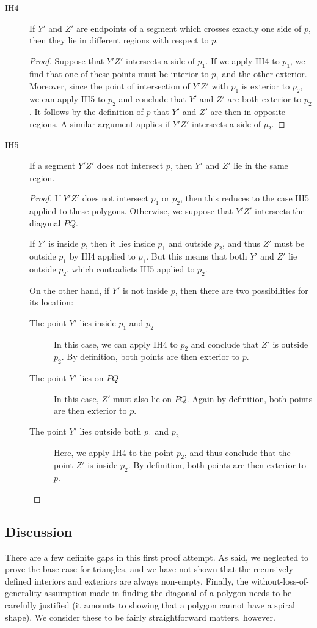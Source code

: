 \begin{description}
\item[IH4] If $Y'$ and $Z'$ are endpoints of a segment which crosses exactly one side of $p$, then they lie in different regions with respect to $p$.
  \begin{proof}
     Suppose that $Y'Z'$ intersects a side of $p_1$. If we apply IH4 to $p_1$, we find that one of these points must be interior to $p_1$ and the other exterior. Moreover, since the point of intersection of $Y'Z'$ with $p_1$ is exterior to $p_2$, we can apply IH5 to $p_2$ and conclude that $Y'$ and $Z'$ are both exterior to $p_2$. It follows by the definition of $p$ that $Y'$ and $Z'$ are then in opposite regions. A similar argument applies if $Y'Z'$ intersects a side of $p_2$.
  \end{proof}
\item[IH5] If a segment $Y'Z'$ does not intersect $p$, then $Y'$ and $Z'$ lie in the same region.
  \begin{proof}
    If $Y'Z'$ does not intersect $p_1$ or $p_2$, then this reduces to the case IH5 applied to these polygons. Otherwise, we suppose that $Y'Z'$ intersects the diagonal $PQ$. 

    If $Y'$ is inside $p$, then it lies inside $p_1$ and outside $p_2$, and thus $Z'$ must be outside $p_1$ by IH4 applied to $p_1$. But this means that both $Y'$ and $Z'$ lie outside $p_2$, which contradicts IH5 applied to $p_2$. 

    On the other hand, if $Y'$ is not inside $p$, then there are two possibilities for its location:
    \begin{description}
    \item[The point $Y'$ lies inside $p_1$ and $p_2$] In this case, we can apply IH4 to $p_2$ and conclude that $Z'$ is outside $p_2$. By definition, both points are then exterior to $p$. 
    \item[The point $Y'$ lies on $PQ$] In this case, $Z'$ must also lie on $PQ$. Again by definition, both points are then exterior to $p$.
    \item[The point $Y'$ lies outside both $p_1$ and $p_2$] Here, we apply IH4 to the point $p_2$, and thus conclude that the point $Z'$ is inside $p_2$. By definition, both points are then exterior to $p$.
    \end{description}
  \end{proof}
\end{description}

\subsection{Discussion}
There are a few definite gaps in this first proof attempt. As said, we neglected to prove the base case for triangles, and we have not shown that the recursively defined interiors and exteriors are always non-empty. Finally, the without-loss-of-generality assumption made in finding the diagonal of a polygon needs to be carefully justified (it amounts to showing that a polygon cannot have a spiral shape).
 We consider these to be fairly straightforward matters, however. 

